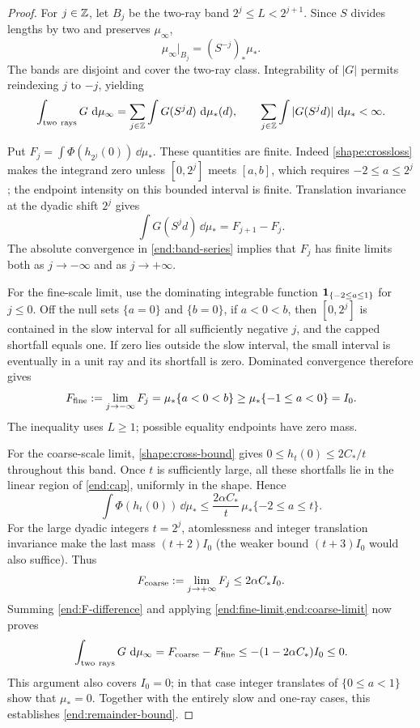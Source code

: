 \begin{proof}
For $j\in\mathbb{Z}$, let $B_j$ be the two-ray band
$2^j\le L<2^{j+1}$.  Since $S$ divides lengths by two and preserves
$\mu_\infty$,
\[
 \mu_\infty|_{B_j}=(S^{-j})_*\mu_*.
\]
The bands are disjoint and cover the two-ray class.  Integrability of
$|G|$ permits reindexing $j$ to $-j$, yielding
\begin{equation}\label{end:band-series}
 \int_{\rm two\ rays}G\,\,\mathrm{d}\mu_\infty
 =\sum_{j\in\mathbb{Z}}\int G(S^j d)\,\,\mathrm{d}\mu_*(d),
 \qquad
 \sum_{j\in\mathbb{Z}}\int|G(S^j d)|\,\,\mathrm{d}\mu_*<\infty.
\end{equation}

Put $F_j=\int\Phi(h_{2^j}(0))\,\dd\mu_*$.  These quantities are
finite.  Indeed \cref{shape:crossloss} makes the integrand zero unless
$[0,2^j]$ meets $[a,b]$, which requires $-2\le a\le2^j$; the endpoint
intensity on this bounded interval is finite.  Translation invariance
at the dyadic shift $2^j$ gives
\begin{equation}\label{end:F-difference}
 \int G(S^j d)\,\dd\mu_*=F_{j+1}-F_j.
\end{equation}
The absolute convergence in \cref{end:band-series} implies that $F_j$
has finite limits both as $j\to-\infty$ and as $j\to+\infty$.

For the fine-scale limit, use the dominating integrable function
$\mathbf{1}_{\{-2\le a\le1\}}$ for $j\le0$.  Off the null sets
$\{a=0\}$ and $\{b=0\}$, if $a<0<b$, then $[0,2^j]$ is contained
in the slow interval for all sufficiently negative $j$, and the capped
shortfall equals one.  If zero lies outside the slow interval, the
small interval is eventually in a unit ray and its shortfall is zero.
Dominated convergence therefore gives
\begin{equation}\label{end:fine-limit}
 F_{\rm fine}:=\lim_{j\to-\infty}F_j
 =\mu_*\{a<0<b\}\ge\mu_*\{-1\le a<0\}=I_0.
\end{equation}
The inequality uses $L\ge1$; possible equality endpoints have zero mass.

For the coarse-scale limit, \cref{shape:cross-bound} gives
$0\le h_t(0)\le2C_*/t$ throughout this band.  Once $t$ is sufficiently
large, all these shortfalls lie in the linear region of \cref{end:cap},
uniformly in the shape.  Hence
\[
 \int\Phi(h_t(0))\,\dd\mu_*
 \le \frac{2\alpha C_*}{t}\,
                  \mu_*\{-2\le a\le t\}.
\]
For the large dyadic integers $t=2^j$, atomlessness and integer
translation invariance make the last mass $(t+2)I_0$ (the weaker bound
$(t+3)I_0$ would also suffice).  Thus
\begin{equation}\label{end:coarse-limit}
 F_{\rm coarse}:=\lim_{j\to+\infty}F_j
 \le2\alpha C_*I_0.
\end{equation}
Summing \cref{end:F-difference} and applying
\cref{end:fine-limit,end:coarse-limit} now proves
\[
 \int_{\rm two\ rays}G\,\dd\mu_\infty
 =F_{\rm coarse}-F_{\rm fine}
 \le-(1-2\alpha C_*)I_0\le0.
\]
This argument also covers $I_0=0$; in that case integer translates of
$\{0\le a<1\}$ show that $\mu_*=0$.  Together with the entirely slow
and one-ray cases, this establishes \cref{end:remainder-bound}.
\end{proof}

